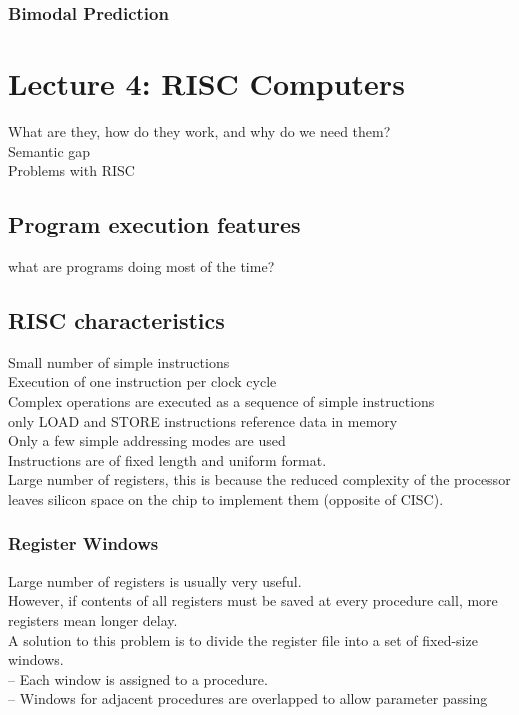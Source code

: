 \documentclass[titlepage, a4paper]{article}
\begin{document}
\subsubsection{Bimodal Prediction}

\section{Lecture 4: RISC Computers}
What are they, how do they work, and why do we need them? \\
Semantic gap \\
Problems with RISC \\

\subsection{Program execution features}
what are programs doing most of the time?

\subsection{RISC characteristics}
Small number of simple instructions \\
Execution of one instruction per clock cycle \\
Complex operations are executed as a sequence of simple instructions \\
only LOAD and STORE instructions reference data in memory \\
Only a few simple addressing modes are used \\
Instructions are of fixed length and uniform format. \\
Large number of registers, this is because the reduced complexity of the processor leaves silicon space on the chip to implement them (opposite of CISC).
\subsubsection{Register Windows}
Large number of registers is usually very useful. \\
However, if contents of all registers must be saved at every procedure call, more registers mean longer delay. \\
A solution to this problem is to divide the register file into a
set of fixed-size windows. \\
-- Each window is assigned to a procedure. \\
-- Windows for adjacent procedures are overlapped to allow parameter passing \\
\end{document}
